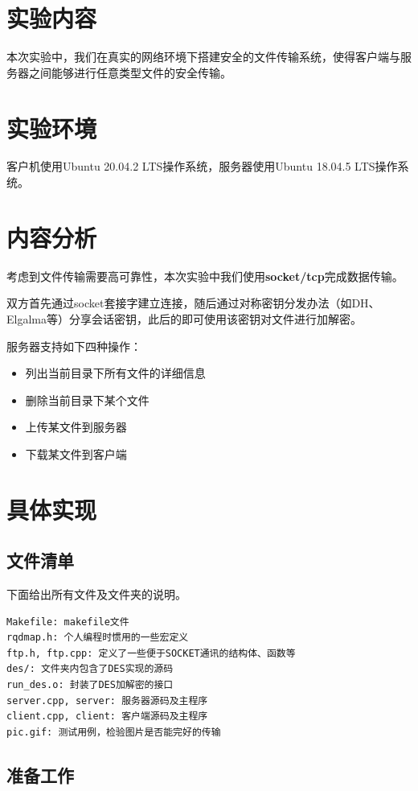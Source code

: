 \documentclass{article}
\begin{document}
\pagestyle{plain}
\setcounter{page}{1}
\begin{spacing}{2.0}
\section{实验内容}
    本次实验中，我们在真实的网络环境下搭建安全的文件传输系统，使得客户端与服务器之间能够进行任意类型文件的安全传输。
\section{实验环境}
    客户机使用Ubuntu 20.04.2 LTS操作系统，服务器使用Ubuntu 18.04.5 LTS操作系统。
\section{内容分析}
    考虑到文件传输需要高可靠性，本次实验中我们使用\textbf{socket/tcp}完成数据传输。

    双方首先通过socket套接字建立连接，随后通过对称密钥分发办法（如DH、Elgalma等）分享会话密钥，此后的即可使用该密钥对文件进行加解密。

    服务器支持如下四种操作：
    \begin{spacing}{1.5} \begin{itemize}
        \item 列出当前目录下所有文件的详细信息
        \item 删除当前目录下某个文件
        \item 上传某文件到服务器
        \item 下载某文件到客户端
    \end{itemize} \end{spacing}
\section{具体实现}
    \subsection{文件清单}
        下面给出所有文件及文件夹的说明。
    \begin{lstlisting}
Makefile: makefile文件
rqdmap.h: 个人编程时惯用的一些宏定义
ftp.h, ftp.cpp: 定义了一些便于SOCKET通讯的结构体、函数等
des/: 文件夹内包含了DES实现的源码
run_des.o: 封装了DES加解密的接口
server.cpp, server: 服务器源码及主程序
client.cpp, client: 客户端源码及主程序
pic.gif: 测试用例，检验图片是否能完好的传输
    \end{lstlisting}

    \subsection{准备工作}   

\end{spacing}
\end{document}
